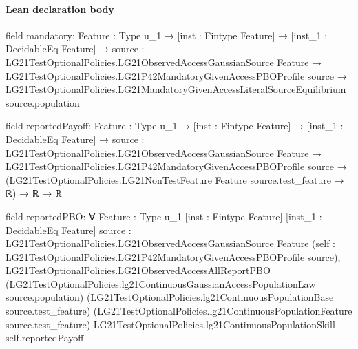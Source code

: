\documentclass[10pt]{article}
\begin{document}
\paragraph{Lean declaration body}
\begin{ReviewVerbatim}
field mandatory:
{Feature : Type u_1} →
  [inst : Fintype Feature] →
    [inst_1 : DecidableEq Feature] →
      {source : LG21TestOptionalPolicies.LG21ObservedAccessGaussianSource Feature} →
        LG21TestOptionalPolicies.LG21P42MandatoryGivenAccessPBOProfile source →
          LG21TestOptionalPolicies.LG21MandatoryGivenAccessLiteralSourceEquilibrium source.population

field reportedPayoff:
{Feature : Type u_1} →
  [inst : Fintype Feature] →
    [inst_1 : DecidableEq Feature] →
      {source : LG21TestOptionalPolicies.LG21ObservedAccessGaussianSource Feature} →
        LG21TestOptionalPolicies.LG21P42MandatoryGivenAccessPBOProfile source →
          (LG21TestOptionalPolicies.LG21NonTestFeature Feature source.test_feature → ℝ) → ℝ → ℝ

field reportedPBO:
∀ {Feature : Type u_1} [inst : Fintype Feature] [inst_1 : DecidableEq Feature]
  {source : LG21TestOptionalPolicies.LG21ObservedAccessGaussianSource Feature}
  (self : LG21TestOptionalPolicies.LG21P42MandatoryGivenAccessPBOProfile source),
  LG21TestOptionalPolicies.LG21ObservedAccessAllReportPBO
    (LG21TestOptionalPolicies.lg21ContinuousGaussianAccessPopulationLaw source.population)
    (LG21TestOptionalPolicies.lg21ContinuousPopulationBase source.test_feature)
    (LG21TestOptionalPolicies.lg21ContinuousPopulationFeature source.test_feature)
    LG21TestOptionalPolicies.lg21ContinuousPopulationSkill self.reportedPayoff
\end{ReviewVerbatim}
\end{document}
